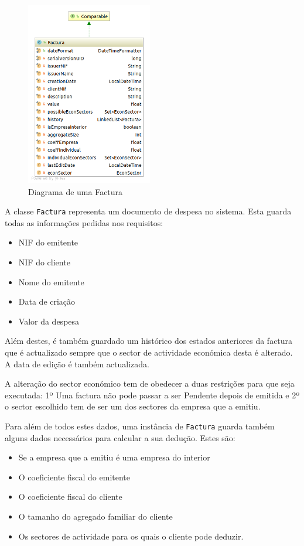 \documentclass[12pt,a4paper]{report}
\begin{document}
    \begin{figure}
        \includegraphics[width=5.5cm]{./images/Factura.png}
        \caption{Diagrama de uma Factura}\label{fig:Factura}
    \end{figure}

    A classe \texttt{Factura} representa um documento de despesa no
    sistema. Esta guarda todas as informações pedidas nos requisitos:
    \begin{multicols}{2}
        \begin{itemize}
            \item NIF do emitente
            \item NIF do cliente
            \item Nome do emitente
            \item Data de criação
            \item Valor da despesa
        \end{itemize}
    \end{multicols}
    Além destes, é também guardado um histórico dos estados anteriores da factura
    que é actualizado sempre que o sector de actividade económica desta é
    alterado. A data de edição é também actualizada.

    A alteração do sector económico tem de obedecer a duas restrições para que
    seja executada: 1º Uma factura não pode passar a ser Pendente depois de
    emitida e 2º o sector escolhido tem de ser um dos sectores da empresa que a
    emitiu.

    Para além de todos estes dados, uma instância de \texttt{Factura}
    guarda também alguns dados necessários para calcular a sua dedução. Estes são:
    \begin{itemize}
        \item Se a empresa que a emitiu é uma empresa do interior
        \item O coeficiente fiscal do emitente
        \item O coeficiente fiscal do cliente
        \item O tamanho do agregado familiar do cliente
        \item Os sectores de actividade para os quais o cliente
            pode deduzir.
    \end{itemize}
\end{document}
